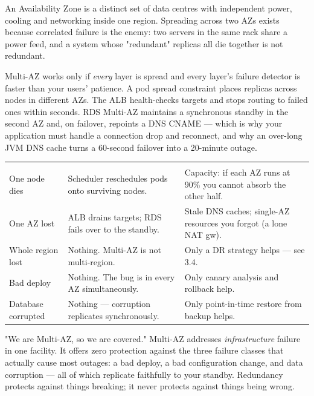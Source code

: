  An Availability Zone is a distinct set of data centres with independent power, cooling and networking inside one region. Spreading across two AZs exists because correlated failure is the enemy: two servers in the same rack share a power feed, and a system whose "redundant" replicas all die together is not redundant.

 Multi-AZ works only if \emph{every} layer is spread and every layer's failure detector is faster than your users' patience. A pod spread constraint places replicas across nodes in different AZs. The ALB health-checks targets and stops routing to failed ones within seconds. RDS Multi-AZ maintains a synchronous standby in the second AZ and, on failover, repoints a DNS CNAME --- which is why your application must handle a connection drop and reconnect, and why an over-long JVM DNS cache turns a 60-second failover into a 20-minute outage.

\begin{center}\small
\wbrowcolors
\begin{tabularx}{\linewidth}{@{}L{32mm} X L{30mm}@{}}
 &  & \\
One node dies & Scheduler reschedules pods onto surviving nodes. & Capacity: if each AZ runs at 90\% you cannot absorb the other half.\\
One AZ lost & ALB drains targets; RDS fails over to the standby. & Stale DNS caches; single-AZ resources you forgot (a lone NAT gw).\\
Whole region lost & Nothing. Multi-AZ is not multi-region. & Only a DR strategy helps --- see 3.4.\\
Bad deploy & Nothing. The bug is in every AZ simultaneously. & Only canary analysis and rollback help.\\
Database corrupted & Nothing --- corruption replicates synchronously. & Only point-in-time restore from backup helps.\\
\end{tabularx}
\end{center}

\begin{misconception}
"We are Multi-AZ, so we are covered." Multi-AZ addresses \emph{infrastructure} failure in one facility. It offers zero protection against the three failure classes that actually cause most outages: a bad deploy, a bad configuration change, and data corruption --- all of which replicate faithfully to your standby. Redundancy protects against things breaking; it never protects against things being wrong.
\end{misconception}

